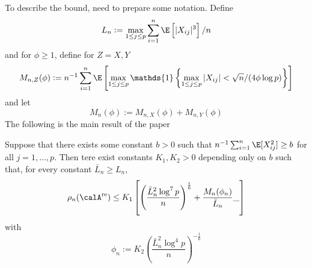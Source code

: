 To describe the bound, need to prepare some notation. Define 
\[L_n := \max_{1\leq j \leq p} \sum_{i=1}^n \E\left[|X_{ij}|^3\right]/n\]
and for $\phi \geq 1$, define for $Z = X,Y$
\begin{equation}
	\label{eq:cck17-5}
	M_{n,Z}(\phi) := n^{-1}\sum_{i=1}^n \E\left[\max_{1\leq j \leq p}\mathds{1}\left\{\max_{1\leq j \leq p} |X_{ij}| < \sqrt{n}/(4\phi\log p)\right\}\right]
\end{equation}
and let 
\[M_n(\phi) := M_{n,X}(\phi) + M_{n,Y}(\phi)\]
The following is the main result of the paper 
\begin{theorem}
	\label{thm:ckk17-1}
	Suppose that there exists some constant $b > 0$ such that $n^{-1}\sum_{i=1}^n \E[X_{ij}^2] \geq b$ for all $j = 1, \dots, p$. Then tere exist constants $K_1, K_2 > 0$ depending only on $b$ such that, for every constant $\bar{L}_n \geq L_n$,
	\begin{equation}
		\label{eq:cck17-6}
		\rho_n(\calA^{\text{re}}) \leq K_1 \left[\left(\frac{\bar{L}^2_n\log^7 p}{n}\right)^{\frac{1}{6}} + \frac{M_n(\phi_n)}{\bar{L}_n}\_\right]
	\end{equation}
	with 
	\begin{equation}
		\label{eq:cck17-7}
		\phi_n := K_2\left(\frac{\bar{L}_n^2 \log^4 p}{n} \right)^{-\frac{1}{6}}
	\end{equation}
\end{theorem}

